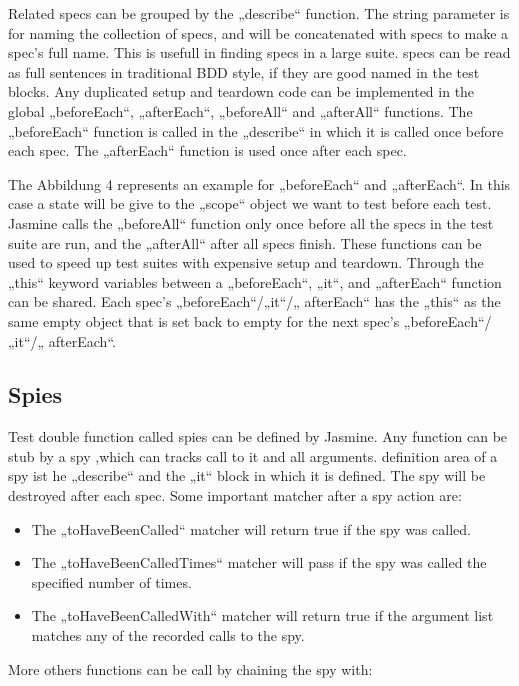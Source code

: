 \documentclass[11pt]{article}
\begin{document}
Related specs can be grouped by the „describe“ function. The string parameter is for naming the collection of specs, and will be concatenated with specs to make a spec’s full name. This is usefull in finding specs in a large suite. specs can be read as full sentences in traditional BDD style, if they are good named in the test blocks. Any duplicated setup and teardown code can be implemented in the global „beforeEach“, „afterEach“, „beforeAll“ and „afterAll“ functions. The „beforeEach“ function is called in the „describe“ in which it is called once before each spec. The „afterEach“ function is used once after each spec.

The Abbildung 4 represents an example for „beforeEach“ and „afterEach“. In this case a state will be give to the „scope“ object we want to test before each test. Jasmine calls the „beforeAll“ function only once before all the specs in the test suite are run, and the „afterAll“ after all specs finish. These functions can be used to speed up test suites with expensive setup and teardown. Through the „this“ keyword variables between a „beforeEach“, „it“, and „afterEach“ function can be shared. Each spec’s „beforeEach“/„it“/„ afterEach“ has the „this“ as the same empty object that is set back to empty for the next spec’s „beforeEach“/„it“/„ afterEach“.

\subsection{Spies}

Test double function called spies can be defined by Jasmine. Any function can be stub by a spy ,which can tracks call to it and all arguments. definition area of a spy ist he „describe“ and the „it“ block in which it is defined. The spy will be destroyed after each spec. Some important matcher after a spy action are:

\begin{itemize}
\item The „toHaveBeenCalled“ matcher will return true if the spy was called.
\item The „toHaveBeenCalledTimes“ matcher will pass if the spy was called the specified number of times.
\item The „toHaveBeenCalledWith“ matcher will return true if the argument list matches any of the recorded calls to the spy.
\end{itemize}

More others functions can be call by chaining the spy with:
\end{document}
